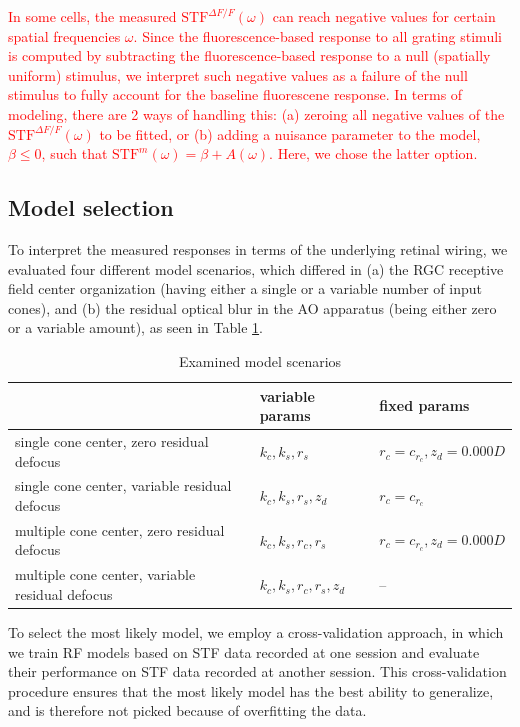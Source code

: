 \documentclass[11pt, oneside]{article}   	%
\begin{document}
\textcolor{red}{In some cells, the measured $\mbox{STF}^{\Delta F / F}(\omega)$ can reach negative values for certain spatial frequencies $\omega$. Since the fluorescence-based response to all grating stimuli is computed by subtracting the fluorescence-based response to a null (spatially uniform) stimulus, we interpret such negative values as a failure of the null stimulus to fully account for the baseline fluorescene response. In terms of modeling, there are 2 ways of handling this: (a) zeroing all negative values of the $\mbox{STF}^{\Delta F / F}(\omega)$ to be fitted, or (b) adding a nuisance parameter to the model, $\beta \le 0$, such that $\mbox{STF}^{m}(\omega) = \beta + A(\omega)$. Here, we chose the latter option.}


\subsection{Model selection}


To interpret the measured responses in terms of the underlying retinal wiring, we evaluated four different model scenarios, which differed in (a) the RGC receptive field center organization (having either a single or a variable number of input cones), and (b) the residual optical blur in the AO apparatus (being either zero or a variable amount), as seen in Table \ref{table:ModelAssessment}.

\begin{table}[h]
\centering
\begin{tabular}{|l | l  l |}
\hline
\rowcolor{LightSlateGray!35!Lavender}  \multicolumn{1}{|l|}{\textbf{model scenario}} & \textbf{variable params} & \textbf{fixed params} \\
\hline
\hline
single cone center, zero residual defocus        & $k_c, k_s, r_s$                 &  $r_c = c_{r_c}, z_{d} = 0.000D$  \\
single cone center, variable residual defocus      & $k_c, k_s, r_s, z_{d}$ & $r_c = c_{r_c}$ \\
multiple cone center, zero residual defocus        & $k_c, k_s, r_c, r_s$                 &  $r_c = c_{r_c}, z_{d} = 0.000D$ \\
multiple cone center, variable residual defocus    & $k_c, k_s, r_c, r_s, z_{d}$ & -- \\
\hline
\end{tabular}
\caption{Examined model scenarios}
\label{table:ModelAssessment}
\end{table}

To select the most likely model, we employ a cross-validation approach, in which we train RF models based on STF data recorded at one session and evaluate their performance on STF data recorded at another session. This cross-validation procedure ensures that the most likely model has the best ability to generalize, and is therefore not picked because of overfitting the data.
\end{document}
